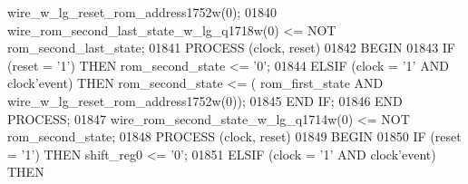\begin{DoxyCode}
{{      wire_w_lg_reset_rom_address1752w}\textcolor{vhdlchar}{(}\textcolor{vhdllogic}{}\textcolor{vhdllogic}{0}\textcolor{vhdlchar}{)};
01840     \textcolor{vhdlchar}{wire_rom_second_last_state_w_lg_q1718w}\textcolor{vhdlchar}{(}\textcolor{vhdllogic}{}\textcolor{vhdllogic}{0}\textcolor{vhdlchar}{)} \textcolor{vhdlchar}{<=} \textcolor{keywordflow}{NOT} \textcolor{vhdlchar}{rom_second_last_state};
01841     \textcolor{keywordflow}{PROCESS} (clock, reset)
01842 \textcolor{vhdlkeyword}{    BEGIN}
01843         \textcolor{keywordflow}{IF} \textcolor{vhdlchar}{(}\textcolor{vhdlchar}{reset} \textcolor{vhdlchar}{=} \textcolor{vhdlchar}{'}\textcolor{vhdllogic}{}\textcolor{vhdllogic}{1}\textcolor{vhdlchar}{'}\textcolor{vhdlchar}{)} \textcolor{keywordflow}{THEN} \textcolor{vhdlchar}{rom_second_state} \textcolor{vhdlchar}{<=} \textcolor{vhdlchar}{'}\textcolor{vhdllogic}{}\textcolor{vhdllogic}{0}\textcolor{vhdlchar}{'};
01844         \textcolor{keywordflow}{ELSIF} \textcolor{vhdlchar}{(}\textcolor{vhdlchar}{clock} \textcolor{vhdlchar}{=} \textcolor{vhdlchar}{'}\textcolor{vhdllogic}{}\textcolor{vhdllogic}{1}\textcolor{vhdlchar}{'} \textcolor{keywordflow}{AND} \textcolor{vhdlchar}{clock}\textcolor{vhdlchar}{'}\textcolor{vhdlkeyword}{event}\textcolor{vhdlchar}{)} \textcolor{keywordflow}{THEN} \textcolor{vhdlchar}{rom_second_state} \textcolor{vhdlchar}{<=} \textcolor{vhdlchar}{(}\textcolor{vhdlchar}{
      rom_first_state} \textcolor{keywordflow}{AND} \textcolor{vhdlchar}{wire_w_lg_reset_rom_address1752w}\textcolor{vhdlchar}{(}\textcolor{vhdllogic}{}\textcolor{vhdllogic}{0}\textcolor{vhdlchar}{)}\textcolor{vhdlchar}{)};
01845         \textcolor{keywordflow}{END} \textcolor{keywordflow}{IF};
01846     \textcolor{keywordflow}{END} \textcolor{keywordflow}{PROCESS};
01847     \textcolor{vhdlchar}{wire_rom_second_state_w_lg_q1714w}\textcolor{vhdlchar}{(}\textcolor{vhdllogic}{}\textcolor{vhdllogic}{0}\textcolor{vhdlchar}{)} \textcolor{vhdlchar}{<=} \textcolor{keywordflow}{NOT} \textcolor{vhdlchar}{rom_second_state};
01848     \textcolor{keywordflow}{PROCESS} (clock, reset)
01849 \textcolor{vhdlkeyword}{    BEGIN}
01850         \textcolor{keywordflow}{IF} \textcolor{vhdlchar}{(}\textcolor{vhdlchar}{reset} \textcolor{vhdlchar}{=} \textcolor{vhdlchar}{'}\textcolor{vhdllogic}{}\textcolor{vhdllogic}{1}\textcolor{vhdlchar}{'}\textcolor{vhdlchar}{)} \textcolor{keywordflow}{THEN} \textcolor{vhdlchar}{shift_reg0} \textcolor{vhdlchar}{<=} \textcolor{vhdlchar}{'}\textcolor{vhdllogic}{}\textcolor{vhdllogic}{0}\textcolor{vhdlchar}{'};
01851         \textcolor{keywordflow}{ELSIF} \textcolor{vhdlchar}{(}\textcolor{vhdlchar}{clock} \textcolor{vhdlchar}{=} \textcolor{vhdlchar}{'}\textcolor{vhdllogic}{}\textcolor{vhdllogic}{1}\textcolor{vhdlchar}{'} \textcolor{keywordflow}{AND} \textcolor{vhdlchar}{clock}\textcolor{vhdlchar}{'}\textcolor{vhdlkeyword}{event}\textcolor{vhdlchar}{)} \textcolor{keywordflow}{THEN} 
}
\end{DoxyCode}
